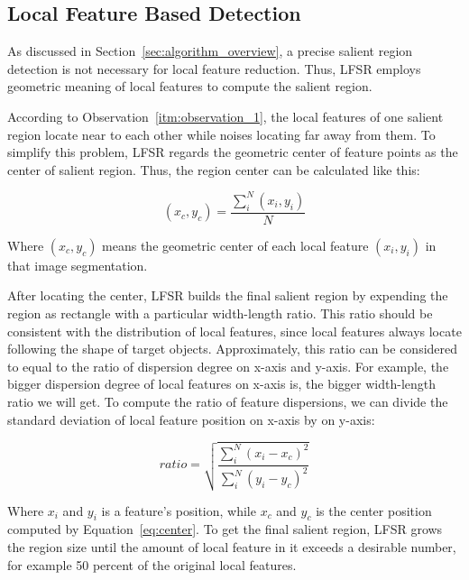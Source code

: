 \subsection{Local Feature Based Detection}
\label{sec:algorithm_detection}

As discussed in Section~\ref{sec:algorithm_overview}, a precise salient region detection is not necessary for local feature reduction. Thus, LFSR employs geometric meaning of local features to compute the salient region.

According to Observation~\ref{itm:observation_1}, the local features of one salient region locate near to each other while noises locating far away from them. To simplify this problem, LFSR regards the geometric center of feature points as the center of salient region. Thus, the region center can be calculated like this:

{\begin{equation} \label{eq:center}
\left({x}_{c},{y}_{c} \right) = \frac{\sum_{i}^{N}\left({x}_{i},{y}_{i} \right)}{N}
\end{equation}}

Where $\left({x}_{c},{y}_{c} \right)$ means the geometric center of each local feature $\left({x}_{i},{y}_{i} \right)$ in that image segmentation.

After locating the center, LFSR builds the final salient region by expending the region as rectangle with a particular width-length ratio. This ratio should be consistent with the distribution of local features, since local features always locate following the shape of target objects. Approximately, this ratio can be considered to equal to the ratio of dispersion degree on x-axis and y-axis. For example, the bigger dispersion degree of local features on x-axis is, the bigger width-length ratio we will get. To compute the ratio of feature dispersions, we can divide the standard deviation of local feature position on x-axis by on y-axis:

{\begin{equation} \label{eq:ratio}
ratio = \sqrt{\frac{\sum_{i}^{N}\left ( x_{i}-x_{c} \right )^{2}}{\sum_{i}^{N}\left ( y_{i}-y_{c} \right )^{2}}}
\end{equation}}

Where $x_{i}$ and $y_{i}$ is a feature's position, while $x_{c}$ and $y_{c}$ is the center position computed by Equation~\ref{eq:center}. To get the final salient region, LFSR grows the region size until the amount of local feature in it exceeds a desirable number, for example 50 percent of the original local features.

